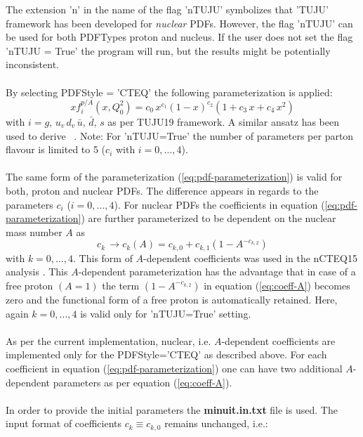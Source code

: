 \documentclass{article}
\begin{document}
\noindent The extension 'n' in the name of the flag 'nTUJU' symbolizes that 'TUJU' framework has been developed for \textit{nuclear} PDFs. However, the flag 'nTUJU' can be used for both PDFTypes proton and nucleus. If the user does not set the flag 'nTUJU = True' the program will run, but the results might be potentially inconsistent. \\
\\
By selecting PDFStyle = 'CTEQ' the following parameterization is applied:
\begin{equation}
xf^{p/A}_i\left(x,Q_0^2 \right) = c_0\,x^{c_1} (1-x)^{c_2} \left(1+c_3\,x + c_4\,x^2 \right)
\label{eq:pdf-parameterization}
\end{equation}
with $i=g,\,u_v\,d_v\,\bar{u},\,\bar{d},\,s$ as per TUJU19 framework. A similar ansatz has been used to derive ~\cite{hera20}. Note: For 'nTUJU=True' the number of parameters per parton flavour is limited to 5 ($c_i$ with $i=0,...,4$).\\
\\
The same form of the parameterization (\ref{eq:pdf-parameterization}) is valid for both, proton and nuclear PDFs. The difference appears in regards to the parameters $c_i$ ($i=0,...,4$). For nuclear PDFs the coefficients in equation (\ref{eq:pdf-parameterization}) are further parameterized to be dependent on the nuclear mass number $A$ as
\begin{equation}
c_k\,\rightarrow c_k(A) = c_{k,0}+c_{k,1}\left( 1 - A^{-c_{k,2}} \right)
\label{eq:coeff-A}
\end{equation}
with $k={0,\dots,4}$. This form of $A$-dependent coefficients was used in the nCTEQ15 analysis \cite{nCTEQ15}. This $A$-dependent parameterization has the advantage that in case of a free proton $(A=1)$ the term $\left( 1 - A^{-c_{k,2}} \right)$ in equation (\ref{eq:coeff-A}) becomes zero and the functional form of a free proton is automatically retained. Here, again $k={0,\dots,4}$ is valid only for 'nTUJU=True' setting.\\
\\
As per the current implementation, nuclear, i.e. $A$-dependent coefficients are implemented only for the PDFStyle='CTEQ' as described above. For each coefficient in equation (\ref{eq:pdf-parameterization}) one can have two additional $A$-dependent parameters as per equation (\ref{eq:coeff-A}).\\
\\
In order to provide the initial parameters the \textbf{minuit.in.txt} file is used. The input format of coefficients $c_k \equiv c_{k,0}$ remains unchanged, i.e.:\\ 
\end{document}
